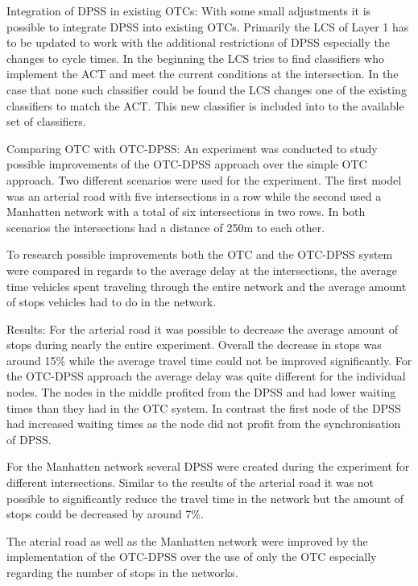 Integration of DPSS in existing OTCs: With some small adjustments it is possible to integrate DPSS into existing OTCs. Primarily the LCS of Layer 1 has to be updated to work with the additional restrictions of DPSS especially the changes to cycle times. In the beginning the LCS tries to find classifiers who implement the ACT and meet the current conditions at the intersection. In the case that none such classifier could be found the LCS changes one of the existing classifiers to match the ACT. This new classifier is included into to the available set of classifiers.\cite{organic1}

Comparing OTC with OTC-DPSS: An experiment was conducted to study possible improvements of the OTC-DPSS approach over the simple OTC approach. Two different scenarios were used for the experiment. The first model was an arterial road with five intersections in a row while the second used a Manhatten network with a total of six intersections in two rows. In both scenarios the intersections had a distance of 250m to each other.

To research possible improvements both the OTC and the OTC-DPSS system were compared in regards to the average delay at the intersections, the average time vehicles spent traveling through the entire network and the average amount of stops vehicles had to do in the network.\cite{organic1}

Results: For the arterial road it was possible to decrease the average amount of stops during nearly the entire experiment. Overall the decrease in stops was around 15\% while the average travel time could not be improved significantly. For the OTC-DPSS approach the average delay was quite different for the individual nodes. The nodes in the middle profited from the DPSS and had lower waiting times than they had in the OTC system. In contrast the first node of the DPSS had increased waiting times as the node did not profit from the synchronisation of DPSS.

For the Manhatten network several DPSS were created during the experiment for different intersections. Similar to the results of the arterial road it was not possible to significantly reduce the travel time in the network but the amount of stops could be decreased by around 7\%.\cite{organic1}

The aterial road as well as the Manhatten network were improved by the implementation of the OTC-DPSS over the use of only the OTC especially regarding the number of stops in the networks.

